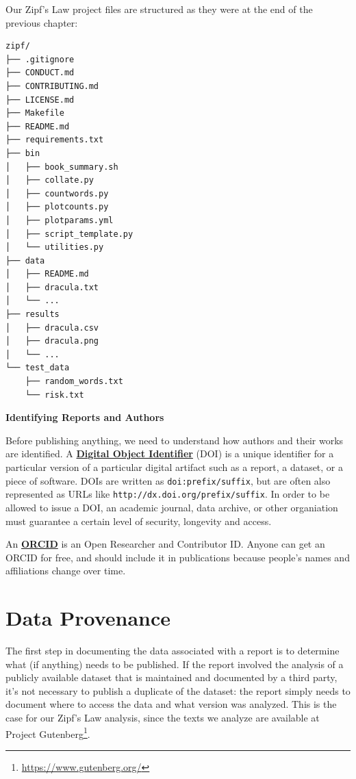 \documentclass[
]{krantz}
\renewenvironment{quote}{\begin{VF}}{\end{VF}}
\renewcommand{\href}[2]{#2\footnote{\url{#1}}}
\newcommand{\gref}[2]{\hyperlink{#2}{\textbf{#1}}}
\begin{document}
Our Zipf's Law project files are structured as they were at the end of the previous chapter:

\begin{verbatim}
zipf/
├── .gitignore
├── CONDUCT.md
├── CONTRIBUTING.md
├── LICENSE.md
├── Makefile
├── README.md
├── requirements.txt
├── bin
│   ├── book_summary.sh
│   ├── collate.py
│   ├── countwords.py
│   ├── plotcounts.py
│   ├── plotparams.yml
│   ├── script_template.py
│   └── utilities.py
├── data
│   ├── README.md
│   ├── dracula.txt
│   └── ...
├── results
│   ├── dracula.csv
│   ├── dracula.png
│   └── ...
└── test_data
    ├── random_words.txt
    └── risk.txt
\end{verbatim}

\begin{quote}
\textbf{Identifying Reports and Authors}

Before publishing anything,
we need to understand how authors and their works are identified.
A \gref{Digital Object Identifier}{doi} (DOI)
is a unique identifier for a particular version of a particular digital artifact
such as a report, a dataset, or a piece of software.
DOIs are written as \texttt{doi:prefix/suffix},
but are often also represented as URLs like \texttt{http://dx.doi.org/prefix/suffix}.
In order to be allowed to issue a DOI,
an academic journal, data archive, or other organiation
must guarantee a certain level of security, longevity and access.

An \gref{ORCID}{orcid}
is an Open Researcher and Contributor ID.
Anyone can get an ORCID for free,
and should include it in publications
because people's names and affiliations change over time.
\end{quote}

\hypertarget{provenance-data}{%
\section{Data Provenance}\label{provenance-data}}

The first step in documenting the data associated with a report
is to determine what (if anything) needs to be published.
If the report involved the analysis of a publicly available dataset
that is maintained and documented by a third party,
it's not necessary to publish a duplicate of the dataset:
the report simply needs to document where to access the data
and what version was analyzed.
This is the case for our Zipf's Law analysis,
since the texts we analyze are available at \href{https://www.gutenberg.org/}{Project Gutenberg}.
\end{document}
